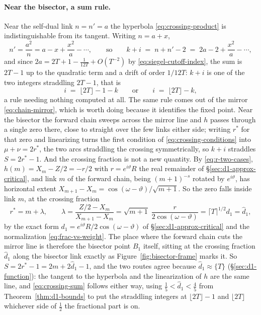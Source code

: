 \documentclass[11pt]{article}
\theoremstyle{definition}
\begin{document}
\paragraph{Near the bisector, a sum rule.} Near the self-dual link $n=n'=a$ the
hyperbola \eqref{eq:crossing-product} is indistinguishable from its tangent.
Writing $n=a+x$,
\begin{equation}\label{eq:crossing-tangent}
n'=\frac{a^{2}}{n}=a-x+\frac{x^{2}}{a}-\cdots ,
\qquad\text{so}\qquad
k+i\;=\;n+n'-2\;=\;2a-2+\frac{x^{2}}{a}-\cdots ,
\end{equation}
and since $2a=2T+1-\tfrac1{12T}+O(T^{-2})$ by
\eqref{eq:siegel-cutoff-index}, the sum is $2T-1$ up to the quadratic term and
a drift of order $1/12T$: $k+i$ is one of the two integers straddling $2T-1$,
that is
\begin{equation}\label{eq:crossing-sum}
i\;=\;\lfloor2T\rfloor-1-k
\qquad\text{or}\qquad
i\;=\;\lfloor2T\rfloor-k ,
\end{equation}
a rule needing nothing computed at all. The same rule comes out of the mirror
\eqref{eq:chain-mirror}, which is worth doing because it identifies the fixed
point. Near the bisector the
forward chain sweeps across the mirror line and $h$ passes through a single
zero there, close to straight over the few links either side; writing $r^{*}$
for that zero and linearizing turns the first condition of
\eqref{eq:crossing-conditions} into $\mu+\nu=2r^{*}$, the two arcs straddling
the crossing symmetrically, so $k+i$ straddles $S=2r^{*}-1$. And the crossing
fraction is not a new quantity.
By \eqref{eq:r-two-cases}, $h(m)=X_m-Z/2=-r/2$ with $r=e^{i\vartheta}R$ the real
remainder of \S\ref{sec:d1-approx-critical}, and link $m$ of the forward chain,
being $(m+1)^{-s}$ rotated by $e^{i\vartheta}$, has horizontal extent
$X_{m+1}-X_m=\cos(\omega-\vartheta)/\sqrt{m+1}$. So the zero falls inside link
$m$, at the crossing fraction
\begin{equation}\label{eq:crossing-rstar}
r^{*}=m+\lambda,
\qquad
\lambda=\frac{Z/2-X_m}{X_{m+1}-X_m}
=\sqrt{m+1}\;\frac{r}{2\cos(\omega-\vartheta)}
=\lceil T\rceil^{1/2}d_1=\hat d_1,
\end{equation}
by the exact form $d_1=e^{i\vartheta}R/2\cos(\omega-\vartheta)$ of
\S\ref{sec:d1-approx-critical} and the normalization
\eqref{eq:frac-vs-weight}. The place where the forward chain cuts the mirror
line is therefore the bisector point $B_1$ itself, sitting at the crossing
fraction $\hat d_1$ along the bisector link exactly as
Figure~\ref{fig:bisector-frame} marks it. So $S=2r^{*}-1=2m+2\hat d_1-1$, and
the two routes agree because $\hat d_1\approx\{T\}$ (\S\ref{sec:d1-function}):
the tangent to the hyperbola and the linearization of $h$ are the same line,
and \eqref{eq:crossing-sum} follows either way, using
$\tfrac15<\hat d_1<\tfrac45$ from Theorem~\ref{thm:d1-bounds} to put the
straddling integers at $\lfloor2T\rfloor-1$ and $\lfloor2T\rfloor$ whichever
side of $\tfrac12$ the fractional part is on.
\end{document}

